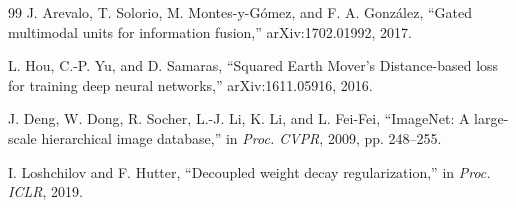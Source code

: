 \documentclass[10pt,letterpaper,twocolumn]{article}
\begin{document}
\begin{thebibliography}{99}
J. Arevalo, T. Solorio, M. Montes-y-G\'{o}mez, and F. A. Gonz\'{a}lez, ``Gated multimodal units for information fusion,'' arXiv:1702.01992, 2017.

L. Hou, C.-P. Yu, and D. Samaras, ``Squared Earth Mover's Distance-based loss for training deep neural networks,'' arXiv:1611.05916, 2016.

J. Deng, W. Dong, R. Socher, L.-J. Li, K. Li, and L. Fei-Fei, ``ImageNet: A large-scale hierarchical image database,'' in \emph{Proc. CVPR}, 2009, pp. 248--255.

I. Loshchilov and F. Hutter, ``Decoupled weight decay regularization,'' in \emph{Proc. ICLR}, 2019.

\end{thebibliography}
\end{document}
